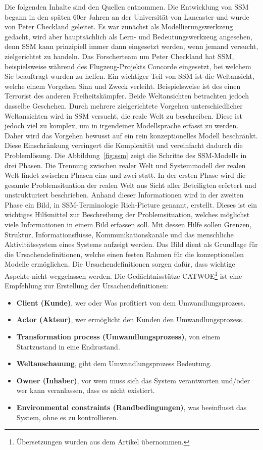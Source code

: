 \documentclass[11pt,a4paper]{report}
\begin{document}
Die folgenden Inhalte sind den Quellen \cite{checkland, bobwill, ssmger} entnommen. Die Entwicklung von SSM begann in den späten 60er Jahren an der Universität von Lancaster und wurde von Peter Checkland geleitet. Es war zunächst als Modellierungswerkzeug gedacht, wird aber hauptsächlich als Lern- und Bedeutungswerkzeug angesehen, denn SSM kann prinzipiell immer dann eingesetzt werden, wenn jemand versucht, zielgerichtet zu handeln. Das Forscherteam um Peter Checkland hat SSM, beispielsweise während des Flugzeug-Projekts Concorde eingesetzt, bei welchem Sie beauftragt wurden zu helfen. Ein wichtiger Teil von SSM ist die Weltansicht, welche einem Vorgehen Sinn und Zweck verleiht. Beispielsweise ist des einen Terrorist des anderen Freiheitskämpfer. Beide Weltansichten betrachten jedoch dasselbe Geschehen. Durch mehrere zielgerichtete Vorgehen unterschiedlicher Weltansichten wird in SSM versucht, die reale Welt zu beschreiben. Diese ist jedoch viel zu komplex, um in irgendeiner Modellsprache erfasst zu werden. Daher wird das Vorgehen bewusst auf ein rein konzeptionelles Modell beschränkt. Diese Einschränkung verringert die Komplexität und vereinfacht dadurch die Problemlösung. Die Abbildung~\ref{fig:ssm} zeigt die Schritte des SSM-Modells in drei Phasen. Die Trennung zwischen realer Welt und Systemmodell der realen Welt findet zwischen Phasen eins und zwei statt. In der ersten Phase wird die gesamte Problemsituation der realen Welt aus Sicht aller Beteiligten erörtert und unstrukturiert beschrieben. Anhand dieser Informationen wird in der zweiten Phase ein Bild, in SSM-Terminologie Rich-Picture genannt, erstellt. Dieses ist ein wichtiges Hilfsmittel zur Beschreibung der Problemsituation, welches möglichst viele Informationen in einem Bild erfassen soll. Mit dessen Hilfe sollen Grenzen, Struktur, Informationsflüsse, Kommunikationskanäle und das menschliche Aktivitätssystem eines Systems aufzeigt werden. Das Bild dient als Grundlage für die Ursachendefinitionen, welche einen festen Rahmen für die konzeptionellen Modelle ermöglichen. Die Ursachendefinitionen sorgen dafür, dass wichtige Aspekte nicht weggelassen werden. Die Gedächtnisstütze CATWOE\footnote{Übersetzungen wurden aus dem Artikel \cite{ssmger} übernommen.} ist eine Empfehlung zur Erstellung der Ursachendefinitionen:

\begin{itemize}[leftmargin=*]
\item \textbf{Client (Kunde)}, wer oder Was profitiert von dem Umwandlungsprozess.
\item \textbf{Actor (Akteur)}, wer ermöglicht den Kunden den Umwandlungsprozess.
\item \textbf{Transformation process (Umwandlungsprozess)}, von einem Startzustand in eine Endzustand.
\item \textbf{Weltanschauung}, gibt dem Umwandlungsprozess Bedeutung.
\item \textbf{Owner (Inhaber)}, vor wem muss sich das System verantworten und/oder wer kann veranlassen, dass es nicht existiert.
\item \textbf{Environmental constraints (Randbedingungen)}, was beeinflusst das System, ohne es zu kontrollieren.
\end{itemize}
\end{document}
